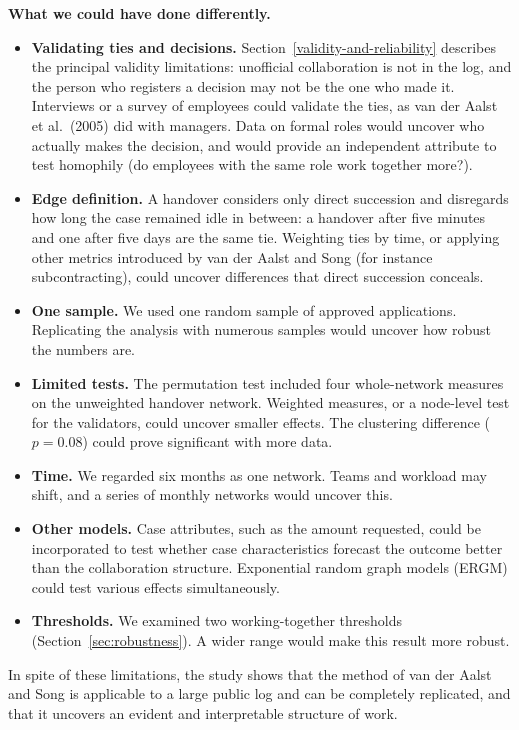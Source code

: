 \documentclass[12pt, a4paper]{article}
\begin{document}
\textbf{What we could have done differently.}
\begin{itemize}[itemsep=2pt]
  \item \textbf{Validating ties and decisions.} Section~\ref{validity-and-reliability} describes the principal validity limitations: unofficial collaboration is not in the log, and the person who registers a decision may not be the one who made it. Interviews or a survey of employees could validate the ties, as van der Aalst et al.\ (2005) did with managers. Data on formal roles would uncover who actually makes the decision, and would provide an independent attribute to test homophily (do employees with the same role work together more?).
  \item \textbf{Edge definition.} A handover considers only direct succession and disregards how long the case remained idle in between: a handover after five minutes and one after five days are the same tie. Weighting ties by time, or applying other metrics introduced by van der Aalst and Song (for instance subcontracting), could uncover differences that direct succession conceals.
  \item \textbf{One sample.} We used one random sample of approved applications. Replicating the analysis with numerous samples would uncover how robust the numbers are.
  \item \textbf{Limited tests.} The permutation test included four whole-network measures on the unweighted handover network. Weighted measures, or a node-level test for the validators, could uncover smaller effects. The clustering difference ($p = 0.08$) could prove significant with more data.
  \item \textbf{Time.} We regarded six months as one network. Teams and workload may shift, and a series of monthly networks would uncover this.
  \item \textbf{Other models.} Case attributes, such as the amount requested, could be incorporated to test whether case characteristics forecast the outcome better than the collaboration structure. Exponential random graph models (ERGM) could test various effects simultaneously.
  \item \textbf{Thresholds.} We examined two working-together thresholds (Section~\ref{sec:robustness}). A wider range would make this result more robust.
\end{itemize}

In spite of these limitations, the study shows that the method of van der Aalst and Song is applicable to a large public log and can be completely replicated, and that it uncovers an evident and interpretable structure of work.
\end{document}
